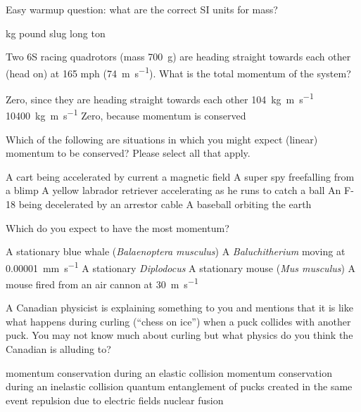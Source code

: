\documentclass[exam,addpoints, noanswers]{exam}
\begin{document}
\begin{questions}
\question[5] Easy warmup question: what are the correct SI units for mass? 
\begin{choices}
\CorrectChoice \si{\kilo\gram}
\choice pound
\choice slug
\choice long ton
\end{choices}

\question[5] Two 6S racing quadrotors (mass \SI{700}{\gram}) are heading straight towards each other (head on) at 165 mph (\SI{74}{\meter\per\second}). What is the total momentum of the system? 
\begin{choices}
\CorrectChoice Zero, since they are heading straight towards each other 
\choice \SI{104}{\kilo\gram\meter\per\second}
\choice \SI{10400}{\kilo\gram\meter\per\second}
\choice Zero, because momentum is conserved
\end{choices}

\question[5] Which of the following are situations in which you might expect (linear) momentum to be conserved? Please select all that apply. 
\begin{choices}
\choice A cart being accelerated by current a magnetic field
\choice A super spy freefalling from a blimp
\choice A yellow labrador retriever accelerating as he runs to catch a ball
\choice An F-18 being decelerated by an arrestor cable
\choice A baseball orbiting the earth 
\end{choices}

\question[5] Which do you expect to have the most momentum?
\begin{choices}
\choice A stationary blue whale (\emph{Balaenoptera musculus})
\choice A \emph{\dag Baluchitherium} moving at \SI{0.00001}{\milli\meter\per\second}
\choice A stationary \emph{\dag Diplodocus}
\choice A stationary mouse (\emph{Mus musculus})
\choice A mouse fired from an air cannon at \SI{30}{\meter\per\second}
\end{choices}

\clearpage
\question[5] A Canadian physicist is explaining something to you and mentions that it is like what happens during curling (``chess on ice'') when a puck collides with another puck. You may not know much about curling but what physics do you think the Canadian is alluding to? 
\begin{choices}
\CorrectChoice momentum conservation during an elastic collision
\choice momentum conservation during an inelastic collision
\choice quantum entanglement of pucks created in the same event
\choice repulsion due to electric fields
\choice nuclear fusion
\end{choices}


\end{questions}
\end{document}
